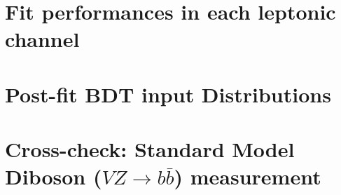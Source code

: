 \documentclass[UKenglish,texlive=2013]{\ATLASLATEXPATH atlasdoc}
\begin{document}
\section{Fit performances in each leptonic channel}
\label{app:AppFit}

%
%
%
%
%
%
%
%
%
%
%
%
%
%
%
%
%
%
%
\clearpage

\clearpage
\section{Post-fit BDT input Distributions}
\label{app:BDTPostfit}

%
\clearpage

\section{Cross-check: Standard Model Diboson ($VZ\rightarrow b\bar{b}$) measurement}
\label{app:dbcheck}

%
\clearpage
%
\end{document}
